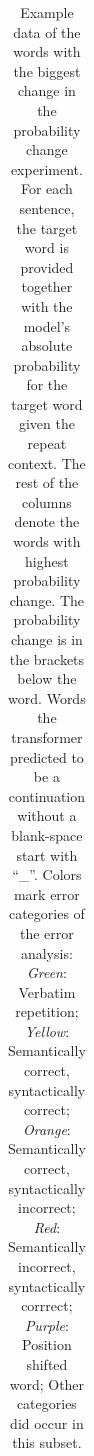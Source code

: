\begin{table}
{\begin{tabular}{c c c c c c c c}
\hline
\end{tabular}
}
\caption{Example data of the words with the biggest change in the probability change experiment. For each sentence, the target word is provided together with the model's absolute probability for the target word given the repeat context. The rest of the columns denote the words with highest probability change. The probability change is in the brackets below the word. Words the transformer predicted to be a continuation without a blank-space start with ``\_''. Colors mark error categories of the error analysis: \textit{Green}: Verbatim repetition; \textit{Yellow}: Semantically correct, syntactically correct; \textit{Orange}: Semantically correct, syntactically incorrect;  \textit{Red}: Semantically incorrect, syntactically corrrect; \textit{Purple}: Position shifted word; Other categories did occur in this subset.} \label{Tab:prediction_change}
\end{table}

